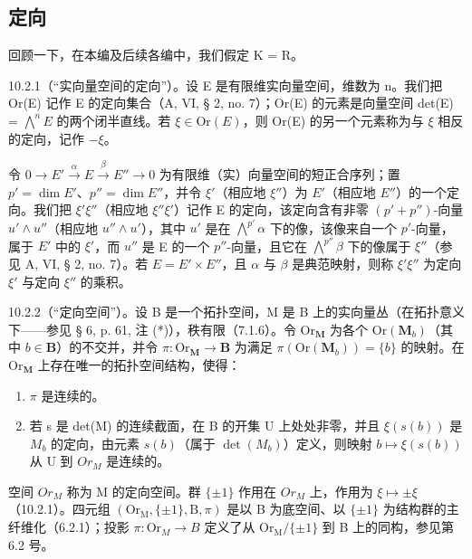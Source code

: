 \subsection{定向}

回顾一下，在本编及后续各编中，我们假定 K = R。

10.2.1（“实向量空间的定向”）。设 E 是有限维实向量空间，维数为 n。我们把 Or(E) 记作 E 的定向集合（A, VI, § 2, no. 7）；Or(E) 的元素是向量空间 det(E) = \(\bigwedge^{n} E\) 的两个闭半直线。若 \(\xi \in \text{Or}(E)\)，则 Or(E) 的另一个元素称为与 \(\xi\) 相反的定向，记作 \(-\xi\)。

令 \(0 \to E' \xrightarrow{\alpha} E \xrightarrow{\beta} E'' \to 0\) 为有限维（实）向量空间的短正合序列；置 \(p' = \dim E'\)、\(p'' = \dim E''\)，并令 \(\xi'\)（相应地 \(\xi''\)）为 \(E'\)（相应地 \(E''\)）的一个定向。我们把 \(\xi'\xi''\)（相应地 \(\xi''\xi'\)）记作 E 的定向，该定向含有非零 \((p' + p'')\)-向量 \(u' \wedge u''\)（相应地 \(u'' \wedge u'\)），其中 \(u'\) 是在 \(\bigwedge^{p'}\alpha\) 下的像，该像来自一个 \(p'\)-向量，属于 \(E'\) 中的 \(\xi'\)，而 \(u''\) 是 E 的一个 \(p''\)-向量，且它在 \(\bigwedge^{p''}\beta\) 下的像属于 \(\xi''\)（参见 A, VI, § 2, no. 7）。若 \(E = E' \times E''\)，且 \(\alpha\) 与 \(\beta\) 是典范映射，则称 \(\xi'\xi''\) 为定向 \(\xi'\) 与定向 \(\xi''\) 的乘积。

10.2.2（“定向空间”）。设 B 是一个拓扑空间，M 是 B 上的实向量丛（在拓扑意义下——参见 § 6, p. 61, 注 (*)），秩有限（7.1.6）。令 \(\mathrm{Or}_{\mathbf{M}}\) 为各个 \(\mathrm{Or}(\mathbf{M}_b)\)（其中 \(b \in \mathbf{B}\)）的不交并，并令 \(\pi: \mathrm{Or}_{\mathbf{M}} \to \mathbf{B}\) 为满足 \(\pi(\mathrm{Or}(\mathbf{M}_b)) = \{b\}\) 的映射。在 \(\mathrm{Or}_{\mathbf{M}}\) 上存在唯一的拓扑空间结构，使得：

\begin{enumerate}
\def\labelenumi{\alph{enumi})}
\item
  \(\pi\) 是连续的。
\item
  若 s 是 det(M) 的连续截面，在 B 的开集 U 上处处非零，并且 \(\xi(s(b))\) 是 \(M_{b}\) 的定向，由元素 \(s(b)\)（属于 \(\det(M_{b})\)）定义，则映射 \(b\mapsto\xi(s(b))\) 从 U 到 \(Or_{M}\) 是连续的。
\end{enumerate}

空间 \(Or_{M}\) 称为 M 的定向空间。群 \(\{\pm1\}\) 作用在 \(Or_{M}\) 上，作用为 \(\xi\mapsto\pm\xi\)（10.2.1）。四元组 \((\mathrm{Or}_{\mathrm{M}},\{\pm1\},\mathrm{B},\pi)\) 是以 B 为底空间、以 \(\{\pm1\}\) 为结构群的主纤维化（6.2.1）；投影 \(\pi:\mathrm{Or}_{M}\to B\) 定义了从 \(\mathrm{Or}_{\mathrm{M}}/\{\pm1\}\) 到 B 上的同构，参见第 6.2 号。

